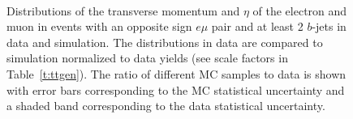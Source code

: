 \begin{figure}
\centering
{}
\\
\caption{Distributions of the transverse momentum and $\eta$ of the electron and muon in events with an opposite sign $e\mu$ pair and at least 2 $b$-jets in data and simulation. The distributions in data are compared to simulation normalized to data yields (see scale factors in Table~\ref{t:ttgen}). The ratio of different MC samples to data is shown with error bars corresponding to the MC statistical uncertainty and a shaded band corresponding to the data statistical uncertainty.}
\label{fig:emu}
\end{figure}

